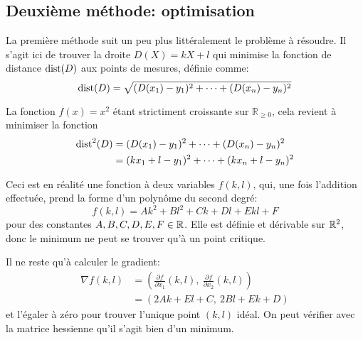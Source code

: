 \subsection{Deuxième méthode: optimisation}

La première méthode suit un peu plus littéralement
le problème à résoudre.
Il s'agit ici de trouver la droite $D(X) = kX+l$
qui minimise la fonction de distance $\mathrm{dist}(D)$
aux points de mesures, définie comme:
\begin{equation}
    \mathrm{dist}(D) = \sqrt{(D(x_1)-y_1)^2+\cdots+(D(x_n)-y_n)^2}
\end{equation}

La fonction $f(x)=x^2$ étant strictiment croissante sur $\mathbb{R}_{\geq 0}$,
cela revient à minimiser la fonction
\begin{equation}
    \begin{aligned}
        \mathrm{dist}^2(D) &= (D(x_1)-y_1)^2+\cdots+(D(x_n)-y_n)^2 \\
                   &= (kx_1+l-y_1)^2+\cdots+(kx_n+l-y_n)^2
    \end{aligned}
\end{equation}

Ceci est en réalité une fonction à deux variables $f(k,l)$,
qui, une fois l'addition effectuée, prend la forme
d'un polynôme du second degré:
\begin{equation}
    f(k,l) = Ak^2+Bl^2+Ck+Dl+Ekl+F
\end{equation}
pour des constantes $A,B,C,D,E,F \in \mathbb{R}$.
Elle est définie et dérivable sur $\mathbb{R}^2$,
donc le minimum ne peut se trouver qu'à un point critique.

Il ne reste qu'à calculer le gradient:
\begin{equation}
    \begin{aligned}
        \nabla f(k,l) &= \left(\frac{\partial f}{\partial x_1}(k,l),\ 
            \frac{\partial f}{\partial x_2}(k,l)\right) \\
        &= (2Ak+El+C,\ 2Bl+Ek+D)
    \end{aligned}
\end{equation}
et l'égaler à zéro pour trouver l'unique point $(k,l)$ idéal.
On peut vérifier avec la matrice hessienne qu'il s'agit bien
d'un minimum.
